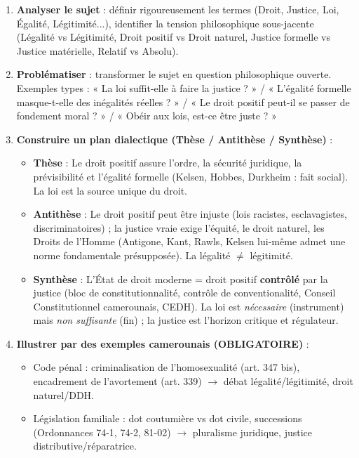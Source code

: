 \documentclass[11pt]{article}
\begin{document}
\begin{methode}
\begin{enumerate}
  \item \textbf{Analyser le sujet} : définir rigoureusement les termes (Droit, Justice, Loi, Égalité, Légitimité...), identifier la tension philosophique sous-jacente (Légalité vs Légitimité, Droit positif vs Droit naturel, Justice formelle vs Justice matérielle, Relatif vs Absolu).
  \item \textbf{Problématiser} : transformer le sujet en question philosophique ouverte. Exemples types : « La loi suffit-elle à faire la justice ? » / « L'égalité formelle masque-t-elle des inégalités réelles ? » / « Le droit positif peut-il se passer de fondement moral ? » / « Obéir aux lois, est-ce être juste ? »
  \item \textbf{Construire un plan dialectique (Thèse / Antithèse / Synthèse)} :
    \begin{itemize}
      \item \textbf{Thèse} : Le droit positif assure l'ordre, la sécurité juridique, la prévisibilité et l'égalité formelle (Kelsen, Hobbes, Durkheim : fait social). La loi est la source unique du droit.
      \item \textbf{Antithèse} : Le droit positif peut être injuste (lois racistes, esclavagistes, discriminatoires) ; la justice vraie exige l'équité, le droit naturel, les Droits de l'Homme (Antigone, Kant, Rawls, Kelsen lui-même admet une norme fondamentale présupposée). La légalité $\neq$ légitimité.
      \item \textbf{Synthèse} : L'État de droit moderne = droit positif \textbf{contrôlé} par la justice (bloc de constitutionnalité, contrôle de conventionalité, Conseil Constitutionnel camerounais, CEDH). La loi est \emph{nécessaire} (instrument) mais \emph{non suffisante} (fin) ; la justice est l'horizon critique et régulateur.
    \end{itemize}
  \item \textbf{Illustrer par des exemples camerounais (OBLIGATOIRE)} :
    \begin{itemize}
      \item Code pénal : criminalisation de l'homosexualité (art. 347 bis), encadrement de l'avortement (art. 339) $\to$ débat légalité/légitimité, droit naturel/DDH.
      \item Législation familiale : dot coutumière vs dot civile, successions (Ordonnances 74-1, 74-2, 81-02) $\to$ pluralisme juridique, justice distributive/réparatrice.

\end{itemize}
\end{enumerate}
\end{methode}
\end{document}
